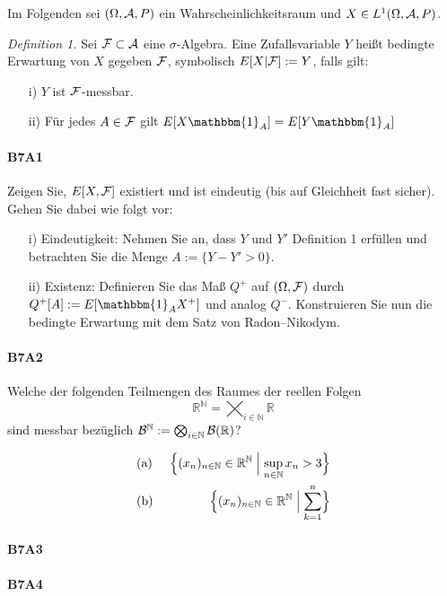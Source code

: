 \documentclass{article}
\begin{document}
Im Folgenden sei $(\Omega,{\cal A},P)$ ein Wahrscheinlichkeitsraum und $X\in L^1(\Omega,{\cal A},P)$.

\emph{Definition 1.} Sei ${\cal F}\subset{\cal A}$ eine $\sigma$-Algebra.
Eine Zufallsvariable $Y$ heißt bedingte Erwartung von $X$ gegeben ${\cal F}$, symbolisch $E[X|{\cal F}]:=Y$, falls gilt:
\begin{itemize}
\item[i)] $Y$ ist ${\cal F}$-messbar.
\item[ii)] Für jedes $A\in{\cal F}$ gilt $E[X\mathbbm{1}_A]=E[Y\mathbbm{1}_A]$
\end{itemize}
\paragraph{B7A1}
Zeigen Sie, $E[X,{\cal F}]$ existiert und ist eindeutig (bis auf Gleichheit fast sicher).
Gehen Sie dabei wie folgt vor:
\begin{itemize}
\item[i)] Eindeutigkeit: Nehmen Sie an, dass $Y$ und $Y'$ Definition 1 erfüllen und betrachten Sie die Menge $A:=\{Y-Y'>0\}$.
\item[ii)] Existenz: Definieren Sie das Maß $Q^+$ auf $(\Omega,{\cal F})$ durch $Q^+[A]:=E[\mathbbm{1}_AX^+]$ und analog $Q^-$.
  Konstruieren Sie nun die bedingte Erwartung mit dem Satz von Radon--Nikodym.
\end{itemize}
\newpage

\paragraph{B7A2}
Welche der folgenden Teilmengen des Raumes der reellen Folgen
\[
\mathbb{R}^\mathbb{N}=\bigtimes_{i\in\mathbb{N}}\mathbb{R}
\]
sind messbar bezüglich ${\cal B}^\mathbb{N}:=\bigotimes_{i\in\mathbb{N}}{\cal B}(\mathbb{R})$?

\begin{alignat*}{2}
  &\text{(a)}~&\Bigl\{(x_n)_{n\in\mathbb{N}}\in\mathbb{R}^{\mathbb{N}}\Bigm|\sup_{n\in\mathbb{N}}x_n>3\Bigr\}\\
  &\text{(b)}~&\Bigl\{(x_n)_{n\in\mathbb{N}}\in\mathbb{R}^{\mathbb{N}}\Bigm|\sum_{k=1}^n\Bigr\}\\
\end{alignat*}
\newpage

\paragraph{B7A3}
\newpage

\paragraph{B7A4}
\newpage



\end{document}
